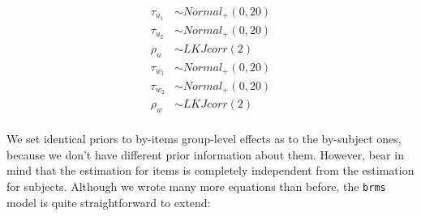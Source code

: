 \documentclass[12pt,]{krantz}
\theoremstyle{definition}
\theoremstyle{definition}
\theoremstyle{definition}
\theoremstyle{remark}
\begin{document}
\begin{equation}
\begin{aligned}
\tau_{u_1} &\sim Normal_+(0,20)\\
\tau_{u_2} &\sim Normal_+(0,20)\\
\rho_u &\sim LKJcorr(2) \\
\tau_{w_1} &\sim Normal_+(0,20)\\
\tau_{w_2} &\sim Normal_+(0,20)\\
\rho_w &\sim LKJcorr(2) \\
\end{aligned}
\end{equation}

We set identical priors to by-items group-level effects as to the by-subject ones, because we don't have different prior information about them. However, bear in mind that the estimation for items is completely independent from the estimation for subjects. Although we wrote many more equations than before, the \texttt{brms} model is quite straightforward to extend:
\end{document}
